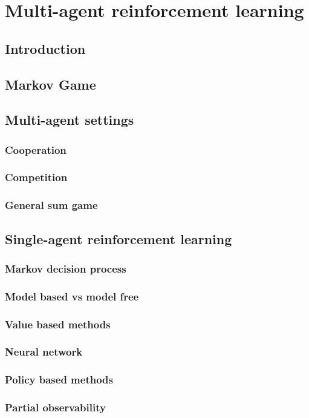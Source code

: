 \chapter{Multi-agent reinforcement learning}\label{ch:marl}
\section{Introduction}
\section{Markov Game}
\section{Multi-agent settings}
\subsection{Cooperation}
\subsection{Competition}
\subsection{General sum game}
\section{Single-agent reinforcement learning}
\subsection{Markov decision process}
\subsection{Model based vs model free}
\subsection{Value based methods}
\subsection{Neural network}
\subsection{Policy based methods}
\subsection{Partial observability}